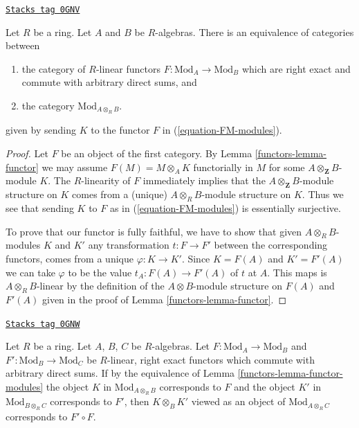 \begin{lemma}
\label{functors-lemma-functor-modules}
\href{https://stacks.math.columbia.edu/tag/0GNV}{\texttt{Stacks tag 0GNV}}

Let $R$ be a ring. Let $A$ and $B$ be $R$-algebras. There is an
equivalence of categories between
\begin{enumerate}
\item the category of $R$-linear functors
$F : \text{Mod}_A \to \text{Mod}_B$ which
are right exact and commute with arbitrary direct sums, and
\item the category $\text{Mod}_{A \otimes_R B}$.
\end{enumerate}
given by sending $K$ to the functor $F$ in (\ref{equation-FM-modules}).
\end{lemma}

\begin{proof}

Let $F$ be an object of the first category. By
Lemma \ref{functors-lemma-functor} we may assume $F(M) = M \otimes_A K$
functorially in $M$ for some $A \otimes_\mathbf{Z} B$-module $K$.
The $R$-linearity of $F$ immediately implies that the
$A \otimes_\mathbf{Z} B$-module structure on $K$ comes
from a (unique) $A \otimes_R B$-module structure on $K$.
Thus we see that sending $K$ to $F$ as in (\ref{equation-FM-modules})
is essentially surjective.

\medskip\noindent
To prove that our functor is fully faithful, we have to show that
given $A \otimes_R B$-modules $K$ and $K'$ any transformation
$t : F \to F'$ between the corresponding functors, comes from
a unique $\varphi : K \to K'$. Since $K = F(A)$ and $K' = F'(A)$
we can take $\varphi$ to be the value $t_A : F(A) \to F'(A)$
of $t$ at $A$. This maps is $A \otimes_R B$-linear by the
definition of the $A \otimes B$-module structure on $F(A)$
and $F'(A)$ given in the proof of Lemma \ref{functors-lemma-functor}.
\end{proof}

\begin{remark}[Composition]
\label{functors-remark-composition}
\href{https://stacks.math.columbia.edu/tag/0GNW}{\texttt{Stacks tag 0GNW}}

Let $R$ be a ring. Let $A$, $B$, $C$ be $R$-algebras.
Let $F : \text{Mod}_A \to \text{Mod}_B$ and
$F' : \text{Mod}_B \to \text{Mod}_C$ be
$R$-linear, right exact functors which commute with arbitrary direct sums.
If by the equivalence of Lemma \ref{functors-lemma-functor-modules} the object
$K$ in $\text{Mod}_{A \otimes_R B}$ corresponds to $F$ and the object
$K'$ in $\text{Mod}_{B \otimes_R C}$ corresponds to $F'$, then
$K \otimes_B K'$ viewed as an object of
$\text{Mod}_{A \otimes_R C}$ corresponds to $F' \circ F$.
\end{remark}

